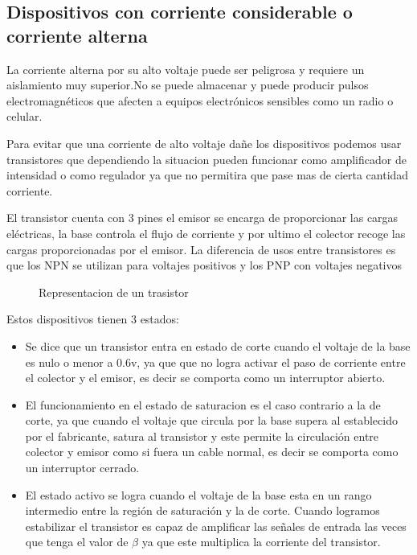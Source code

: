 \documentclass[a4paper]{article}
\begin{document}
\subsection*{Dispositivos con corriente considerable o corriente alterna}

La corriente alterna por su alto voltaje puede ser peligrosa y requiere un 
aislamiento muy superior.No se puede almacenar y puede producir pulsos 
electromagnéticos que afecten a equipos electrónicos sensibles como un radio
 o celular.

Para evitar que una corriente de alto voltaje dañe los dispositivos podemos
usar transistores que dependiendo la situacion pueden funcionar como amplificador
de intensidad o como regulador ya que no permitira que pase mas de cierta cantidad
corriente.

El transistor cuenta con 3 pines el emisor se encarga de proporcionar las cargas 
eléctricas, la base controla el flujo de corriente y por ultimo el colector recoge
las cargas proporcionadas por el emisor. La diferencia de usos entre transistores 
es que los NPN se utilizan para voltajes positivos y los PNP con voltajes negativos

\begin{figure}[h]\centering
    \caption{Representacion de un trasistor}\label{fig:transistorilustrado}
\end{figure}


Estos dispositivos tienen 3 estados:

\begin{itemize}
    \item {
	Se dice que un transistor entra en estado de corte cuando el voltaje
	de la base es nulo o menor a 0.6v, ya que que no logra activar el paso
	de corriente entre el colector y el emisor, es decir se comporta como 
	un interruptor abierto.
    }
    \item {
        El funcionamiento en el estado de saturacion es el caso contrario a la 
	de corte, ya que cuando el voltaje que circula por la base supera al 
	establecido por el fabricante, satura al transistor y este permite la
	 circulación entre colector y emisor como si fuera un cable normal,
	 es decir se comporta como un interruptor cerrado.
    }
    \item {
        El estado activo se logra cuando el voltaje de la base esta en un rango
	intermedio entre la región de saturación y la de corte. 
	Cuando logramos estabilizar el transistor es capaz de amplificar las 
	señales de entrada las veces que tenga el valor de $\beta$ ya que este 
	multiplica la corriente del transistor.
    }    
\end{itemize}
\end{document}
